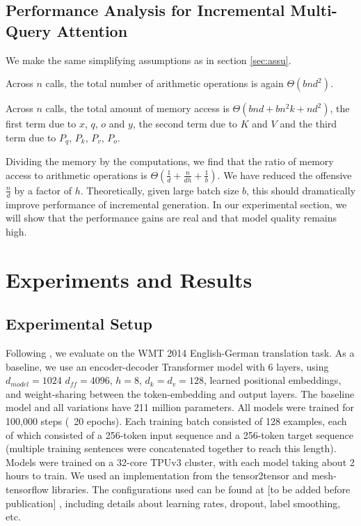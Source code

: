 \documentclass{article}
\begin{document}
\subsection{Performance Analysis for Incremental Multi-Query Attention}

We make the same simplifying assumptions as in section \ref{sec:assu}.

Across $n$ calls, the total number of arithmetic operations is again $\Theta(bnd^2)$.

Across $n$ calls, the total amount of memory access is $\Theta(bnd + bn^2k + nd^2)$, the first term due to $x$, $q$, $o$ and $y$, the second term due to $K$ and $V$ and the third term due to $P_q$, $P_k$, $P_v$, $P_o$.

Dividing the memory by the computations, we find that the ratio of memory access to arithmetic operations is $\Theta(\frac{1}{d} + \frac{n}{dh} + \frac{1}{b})$.  We have reduced the offensive $\frac{n}{d}$ by a factor of $h$.  Theoretically, given large batch size $b$, this should dramatically improve performance of incremental generation.  In our experimental section, we will show that the performance gains are real and that model quality remains high.


\section{Experiments and Results}

\subsection{Experimental Setup}

Following \citep{Vas17}, we evaluate on the WMT 2014 English-German translation task.  As a baseline, we use an encoder-decoder Transformer model with 6 layers, using $d_{model}=1024$ $d_{ff}=4096$, $h=8$, $d_k=d_v=128$, learned positional embeddings, and weight-sharing between the token-embedding and output layers.  The baseline model and all variations have 211 million parameters.  All models were trained for 100,000 steps (~20 epochs).  Each training batch consisted of 128 examples, each of which consisted of a 256-token input sequence and a 256-token target sequence (multiple training sentences were concatenated together to reach this length).   Models were trained on a 32-core TPUv3 cluster, with each model taking about 2 hours to train.  We used an implementation from the tensor2tensor and mesh-tensorflow libraries.  The configurations used can be found at [to be added before publication]  , including details about learning rates, dropout, label smoothing, etc.
\end{document}
